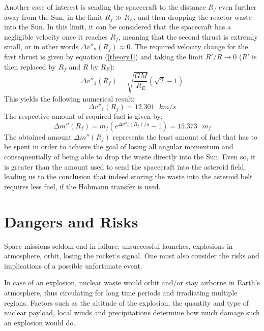 \documentclass[onecolumn,12pt]{article}
\numberwithin{equation}{section}
\begin{document}
Another case of interest is sending the spacecraft to the distance $R_f$ even further away from the Sun, in the limit $R_f \gg R_E$, and then dropping the reactor waste into the Sun. In this limit, it can be considered that the spacecraft has a negligible velocity once it reaches $R_f$, meaning that the second thrust is extremly small, or in other words $\Delta v''_2 (R_f) \approx 0$. The required velocity change for the first thrust is given by equation (\ref{theory1}) and taking the limit $R'/R\rightarrow 0$ ($R'$ is then replaced by $R_f$ and $R$ by $R_E$):
\begin{equation}
    \Delta v''_ 1 (R_f) = \sqrt{\frac{GM}{R_E}} (\sqrt{2}-1)
\end{equation}
This yields the following numerical result:
\begin{equation}
    \Delta v''_ 1 (R_f) = 12.301 \text{ } km/s
\end{equation}
The respective amount of required fuel is given by:
\begin{equation}
    \Delta m'' (R_f) = m_f (e^{\Delta v''_1 (R_f)/u}-1)  = 15.373 \text{ }m_f
    \label{dinu}
\end{equation}
The obtained amount $\Delta m'' (R_f)$ represents the least amount of fuel that has to be spent in order to achieve the goal of losing all angular momentum and consequentially of being able to drop the waste directly into the Sun. Even so, it is greater than the amount used to send the spacecraft into the asteroid field, leading us to the conclusion that indeed storing the waste into the asteroid belt requires less fuel, if the Hohmann transfer is used.


\section{Dangers and Risks}
Space missions seldom end in failure: unsuccessful launches, explosions in atmosphere, orbit, losing the rocket`s signal. One must also consider the risks and implications of a possible unfortunate event. 

In case of an explosion, nuclear waste would orbit and/or stay airborne in Earth's atmosphere, thus circulating for long time periods and irradiating multiple regions. Factors such as the altitude of the explosion, the quantity and type of nuclear payload, local winds and precipitations determine how much damage such an explosion would do.
\end{document}
